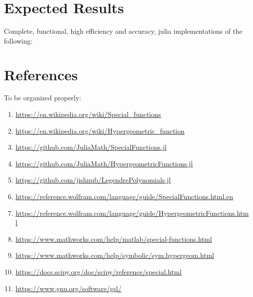 \documentclass{article}
\theoremstyle{mytheoremstyle}
\theoremstyle{mytheoremstyle}
\theoremstyle{myproblemstyle}
\begin{document}
  \section*{Expected Results}\label{sec:References} %
    Complete, functional, high efficiency and accuracy, julia implementations of the following:
  
  \section*{References}\label{sec:References} %
  To be organized properly: 
  \begin{enumerate}
\item \url{https://en.wikipedia.org/wiki/Special_functions}
\item \url{https://en.wikipedia.org/wiki/Hypergeometric_function}
\item \url{https://github.com/JuliaMath/SpecialFunctions.jl}
\item \url{https://github.com/JuliaMath/HypergeometricFunctions.jl}
\item \url{https://github.com/jishnub/LegendrePolynomials.jl}
\item \url{https://reference.wolfram.com/language/guide/SpecialFunctions.html.en}
\item \url{https://reference.wolfram.com/language/guide/HypergeometricFunctions.html}
\item \url{https://www.mathworks.com/help/matlab/special-functions.html}
\item \url{https://www.mathworks.com/help/symbolic/sym.hypergeom.html}
\item \url{https://docs.scipy.org/doc/scipy/reference/special.html}
\item \url{https://www.gnu.org/software/gsl/}
  \end{enumerate}
  
\end{document}
